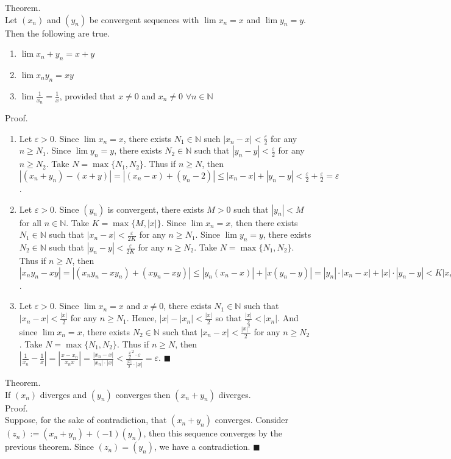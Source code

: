 \documentclass[twocolumn]{article}
\newcommand{\qed}{$\blacksquare$}
\newcommand{\br}{\vspace{\baselineskip}}
\let\eps\varepsilon
\newcommand{\naturals}{\mathbb{N}}
\begin{document}
Theorem. \\
Let $(x_n)$ and $(y_n)$ be convergent sequences with $\lim x_n = x$ and $\lim y_n = y$. Then the following are true.
\begin{enumerate}
	\item
	$\lim x_n + y_n = x + y$
	\item
	$\lim x_ny_n = xy$
	\item
	$\lim \frac{1}{x_n} = \frac{1}{x}$, provided that $x \neq 0$ and $x_n \neq 0$ $\forall n \in \naturals$
\end{enumerate}
Proof.
\begin{enumerate}
	\item
	Let $\eps > 0$. Since $\lim x_n = x$, there exists $N_1 \in \naturals$ such $|x_n - x| < \frac{\eps}{2}$ for any $n \geq N_1$. Since $\lim y_n = y$, there exists $N_2 \in \naturals$ such that $|y_n - y| < \frac{\eps}{2}$ for any $n \geq N_2$. Take $N = \max \{ N_1, N_2 \}$. Thus if $n \geq N$, then $|(x_n + y_n) - (x + y)| = |(x_n - x) + (y_n - 2)| \leq |x_n - x| + |y_n - y| < \frac{\eps}{2} + \frac{\eps}{2} = \eps$.
	\item
	Let $\eps > 0$. Since $(y_n)$ is convergent, there exists $M > 0$ such that $|y_n| < M$ for all $n \in \naturals$. Take $K = \max \{ M, |x| \}$. Since $\lim x_n = x$, then there exists $N_1 \in \naturals$ such that $|x_n - x| < \frac{\eps}{2K}$ for any $n \geq N_1$. Since $\lim y_n = y$, there exists $N_2 \in \naturals$ such that $|y_n - y| < \frac{\eps}{2K}$ for any $n \geq N_2$. Take $N = \max \{ N_1, N_2 \}$. Thus if $n \geq N$, then $|x_ny_n - xy| = |(x_ny_n - xy_n) + (xy_n - xy)| \leq |y_n(x_n - x)| + |x(y_n - y)| = |y_n| \cdot |x_n - x| + |x| \cdot |y_n - y| < K|x_n - x| + K|y_n - y| < \frac{\eps}{2} + \frac{\eps}{2} = \eps$.
	\item
	Let $\eps > 0$. Since $\lim x_n = x$ and $x \neq 0$, there exists $N_1 \in \naturals$ such that $|x_n - x| < \frac{|x|}{2}$ for any $n \geq N_1$. Hence, $|x| - |x_n| < \frac{|x|}{2}$ so that $\frac{|x|}{2} < |x_n|$. And since $\lim x_n = x$, there exists $N_2 \in \naturals$ such that $|x_n - x| < \frac{|x|^2}{2}$ for any $n \geq N_2$. Take $N = \max \{ N_1, N_2 \}$. Thus if $n \geq N$, then $|\frac{1}{x_n} - \frac{1}{x}| = |\frac{x - x_n}{x_nx}| = \frac{|x_n - x|}{|x_n| \cdot |x|} < \frac{\frac{x}{2}^2 \cdot \eps}{\frac{|x|}{2} \cdot |x|} = \eps$. \qed
\end{enumerate} \br

Theorem. \\
If $(x_n)$ diverges and $(y_n)$ converges then $(x_n + y_n)$ diverges. \\
Proof. \\
Suppose, for the sake of contradiction, that $(x_n + y_n)$ converges. Consider $(z_n) := (x_n + y_n) + (-1)(y_n)$, then this sequence converges by the previous theorem. Since $(z_n) = (y_n)$, we have a contradiction. \qed \\
\end{document}
